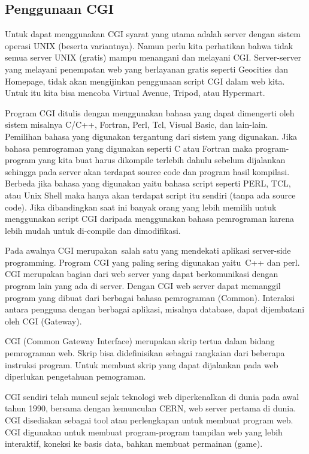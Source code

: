 \subsection{Penggunaan CGI}
Untuk dapat menggunakan CGI syarat yang utama adalah server dengan sistem operasi UNIX (beserta variantnya). Namun perlu kita perhatikan bahwa tidak semua server UNIX (gratis) mampu menangani dan melayani CGI. Server-server yang melayani penempatan web yang berlayanan gratis seperti Geocities dan Homepage, tidak akan mengijinkan penggunaan script CGI dalam web kita. Untuk itu kita bisa mencoba Virtual Avenue, Tripod, atau Hypermart. \par
	\vspace{12pt}
	\noindent
	Program CGI ditulis dengan menggunakan bahasa yang dapat dimengerti oleh sistem misalnya C/C++, Fortran, Perl, Tcl, Visual Basic, dan lain-lain. Pemilihan bahasa yang digunakan tergantung dari sistem yang digunakan. Jika bahasa pemrograman yang digunakan seperti C atau Fortran maka program-program yang kita buat harus dikompile terlebih dahulu sebelum dijalankan sehingga pada server akan terdapat source code dan program hasil kompilasi. Berbeda jika bahasa yang digunakan yaitu bahasa script seperti PERL, TCL, atau Unix Shell maka hanya akan terdapat script itu sendiri (tanpa ada source code). Jika dibandingkan saat ini banyak orang yang lebih memilih untuk menggunakan script CGI daripada menggunakan bahasa pemrograman karena lebih mudah untuk di-compile dan dimodifikasi.  \par
	\vspace{12pt}
	\noindent
	Pada awalnya CGI merupakan~salah satu yang mendekati aplikasi server-side programming.  Program CGI yang paling sering digunakan yaitu~C++ dan perl.  CGI merupakan bagian dari web server yang dapat berkomunikasi dengan program lain yang ada di server. Dengan CGI web server dapat memanggil program yang dibuat dari berbagai bahasa pemrograman (Common). Interaksi antara pengguna dengan berbagai aplikasi, misalnya database, dapat dijembatani oleh CGI (Gateway). \par
	\vspace{12pt}
	\noindent
	CGI (Common Gateway Interface) merupakan skrip tertua dalam bidang pemrograman web. Skrip bisa didefinisikan sebagai rangkaian dari beberapa instruksi program. Untuk membuat skrip yang dapat dijalankan pada web diperlukan pengetahuan pemograman. \par
	\vspace{12pt}
	\noindent
	CGI sendiri telah muncul sejak teknologi web diperkenalkan di dunia pada awal tahun 1990, bersama dengan kemunculan CERN, web server pertama di dunia. CGI disediakan sebagai tool atau perlengkapan untuk membuat program web. CGI digunakan untuk membuat program-program tampilan web yang lebih interaktif, koneksi ke basis data, bahkan membuat permainan (game). \par
